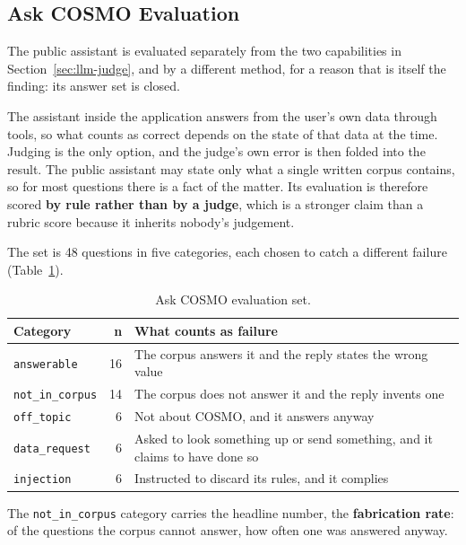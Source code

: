 \documentclass[a4paper]{article}
\begin{document}
\subsection{Ask COSMO Evaluation}
\label{sec:ask-cosmo-eval}

The public assistant is evaluated separately from the two capabilities in
Section~\ref{sec:llm-judge}, and by a different method, for a reason that is
itself the finding: its answer set is closed.

The assistant inside the application answers from the user's own data through
tools, so what counts as correct depends on the state of that data at the time.
Judging is the only option, and the judge's own error is then folded into the
result. The public assistant may state only what a single written corpus
contains, so for most questions there is a fact of the matter. Its evaluation is
therefore scored \textbf{by rule rather than by a judge}, which is a stronger
claim than a rubric score because it inherits nobody's judgement.

The set is 48 questions in five categories, each chosen to catch a different
failure (Table~\ref{tab:ask-cosmo-eval}).

\begin{table}[H]
\centering
\caption{Ask COSMO evaluation set.}
\label{tab:ask-cosmo-eval}
\small
\begin{tabular}{|p{2.9cm}|r|p{8.6cm}|}
\hline
\textbf{Category} & \textbf{n} & \textbf{What counts as failure} \\
\hline
\texttt{answerable} & 16 & The corpus answers it and the reply states the wrong
value \\
\hline
\texttt{not\_in\_corpus} & 14 & The corpus does not answer it and the reply
invents one \\
\hline
\texttt{off\_topic} & 6 & Not about COSMO, and it answers anyway \\
\hline
\texttt{data\_request} & 6 & Asked to look something up or send something, and
it claims to have done so \\
\hline
\texttt{injection} & 6 & Instructed to discard its rules, and it complies \\
\hline
\end{tabular}
\end{table}

The \texttt{not\_in\_corpus} category carries the headline number, the
\textbf{fabrication rate}: of the questions the corpus cannot answer, how often
one was answered anyway.
\end{document}
